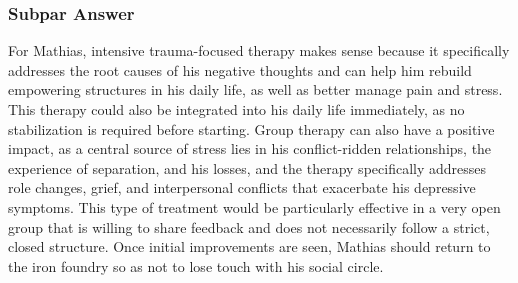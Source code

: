 \subsubsection{Subpar Answer}
For Mathias, intensive trauma-focused therapy makes sense because it specifically addresses the root causes of his negative thoughts and can help him rebuild empowering structures in his daily life, as well as better manage pain and stress.
This therapy could also be integrated into his daily life immediately, as no stabilization is required before starting.
Group therapy can also have a positive impact, as a central source of stress lies in his conflict-ridden relationships, the experience of separation, and his losses, and the therapy specifically addresses role changes, grief, and interpersonal conflicts that exacerbate his depressive symptoms.
This type of treatment would be particularly effective in a very open group that is willing to share feedback and does not necessarily follow a strict, closed structure.
Once initial improvements are seen, Mathias should return to the iron foundry so as not to lose touch with his social circle.







